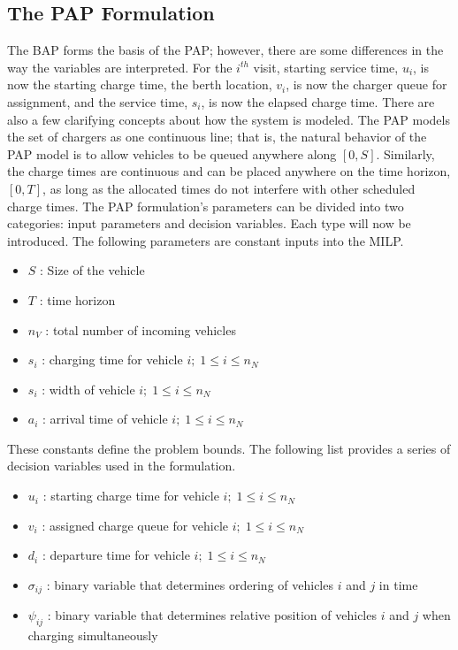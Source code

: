\documentclass[ee,msthesis]{usuthesis}
\begin{document}
\subsection{The PAP Formulation}
\label{sec:input-variables}
The BAP forms the basis of the PAP; however, there are some differences in the way the variables are interpreted. For the
\(i^{th}\) visit, starting service time, \(u_i\), is now the starting charge time, the berth location, \(v_i\), is now the
charger queue for assignment, and the service time, \(s_i\), is now the elapsed charge time. There are also a few clarifying concepts
about how the system is modeled. The PAP models the set of chargers as one continuous line; that is, the natural
behavior of the PAP model is to allow vehicles to be queued anywhere along \([0,S]\). Similarly, the charge times are
continuous and can be placed anywhere on the time horizon, \([0,T]\), as long as the allocated times do not interfere with
other scheduled charge times. The PAP formulation's parameters can be divided into two categories: input parameters and
decision variables. Each type will now be introduced. The following parameters are constant inputs into the MILP.

\begin{itemize}
	\item $S$   : Size of the vehicle
	\item $T$   : time horizon
	\item $n_V$ : total number of incoming vehicles
	\item $s_i$ : charging time for vehicle $i;\; 1 \leq i \leq n_N$
	\item $s_i$ : width of vehicle $i;\; 1 \leq i \leq n_N$
	\item $a_i$ : arrival time of vehicle $i;\; 1 \leq i \leq n_N$
\end{itemize}

These constants define the problem bounds. The following list provides a series of decision variables used in the
formulation.

\begin{itemize}
    \item $u_i$    : starting charge time for vehicle $i;\; 1 \leq i \leq n_N$
    \item $v_i$    : assigned charge queue for vehicle $i;\; 1 \leq i \leq n_N$
    \item $d_i$    : departure time for vehicle $i;\; 1 \leq i \leq n_N$
    \item $\sigma_{ij}$ : binary variable that determines ordering of vehicles $i$ and $j$ in time
    \item $\psi_{ij}$ : binary variable that determines relative position of vehicles $i$ and $j$ when charging simultaneously
\end{itemize}
\end{document}
